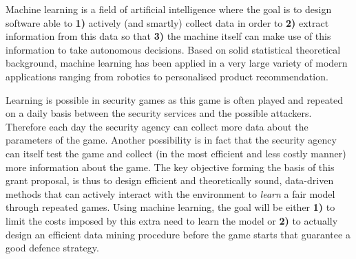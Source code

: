 Machine learning is a field of artificial intelligence where the goal is to design software able to \textbf{ 1)} actively (and smartly) collect data in order to \textbf{2)}  extract information from this data so that \textbf{3)} the machine itself can make use of this information to take autonomous decisions.  Based on solid statistical theoretical background, machine learning has been applied in a very large variety of modern applications ranging from robotics to personalised product recommendation. 

Learning is possible in security games as this game is often played and repeated on a daily basis between the security services and the possible attackers. Therefore each day the security agency can collect more data about the parameters of the game. Another possibility is in fact that the security agency can itself test the game and collect (in the most efficient and less costly manner) more information about the game. The key objective forming the basis of this grant proposal, is thus to design efficient and theoretically sound, data-driven methods that can actively interact with the environment to {\em learn} a fair model through repeated games. Using machine learning, the goal will be either \textbf{1)} to limit the costs imposed by this extra need to learn the model or  \textbf{2)} to actually design an efficient data mining procedure before the game starts that guarantee a good defence strategy.




